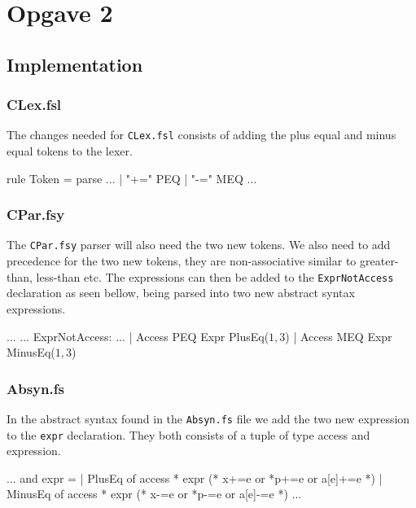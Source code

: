 \section{Opgave 2}
\subsection{Implementation}
\subsubsection*{CLex.fsl}
The changes needed for \texttt{CLex.fsl} consists of adding the plus equal and
minus equal tokens to the lexer.
\begin{ccode}
rule Token = parse
...
  | "+="            { PEQ }
  | "-="            { MEQ }
...
\end{ccode}
\subsubsection*{CPar.fsy}
The \texttt{CPar.fsy} parser will also need the two new tokens. We also need to
add precedence for the two new tokens, they are non-associative similar to
greater-than, less-than etc. The expressions can then be added to the
\texttt{ExprNotAccess} declaration as seen bellow, being parsed into two new
abstract syntax expressions.
\begin{ccode}
...
...
ExprNotAccess:
...
  | Access PEQ Expr                     { PlusEq($1, $3)      } 
  | Access MEQ Expr                     { MinusEq($1, $3)     } 

\end{ccode}
\subsubsection*{Absyn.fs}
In the abstract syntax found in the \texttt{Absyn.fs} file we add the two new
expression to the \texttt{expr} declaration. They both consists of a tuple of
type access and expression.
\begin{fs}
...
and expr =                                                         
  | PlusEq of access * expr          (* x+=e or *p+=e or a[e]+=e    *)
  | MinusEq of access * expr         (* x-=e or *p-=e or a[e]-=e    *)
...
\end{fs}

